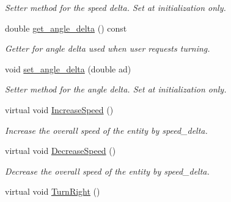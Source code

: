 \begin{DoxyCompactItemize}
\begin{DoxyCompactList}\small\item\em Setter method for the speed delta. Set at initialization only. \end{DoxyCompactList}\item 
double \hyperlink{classMotionHandler_a67c945d11edc741af5c71c3596ead557}{get\+\_\+angle\+\_\+delta} () const \hypertarget{classMotionHandler_a67c945d11edc741af5c71c3596ead557}{}\label{classMotionHandler_a67c945d11edc741af5c71c3596ead557}

\begin{DoxyCompactList}\small\item\em Getter for angle delta used when user requests turning. \end{DoxyCompactList}\item 
void \hyperlink{classMotionHandler_a8c2811ddf1a0f077fec829c460009286}{set\+\_\+angle\+\_\+delta} (double ad)\hypertarget{classMotionHandler_a8c2811ddf1a0f077fec829c460009286}{}\label{classMotionHandler_a8c2811ddf1a0f077fec829c460009286}

\begin{DoxyCompactList}\small\item\em Setter method for the angle delta. Set at initialization only. \end{DoxyCompactList}\item 
virtual void \hyperlink{classMotionHandler_af6b91f5626075b09dba3d14177213622}{Increase\+Speed} ()\hypertarget{classMotionHandler_af6b91f5626075b09dba3d14177213622}{}\label{classMotionHandler_af6b91f5626075b09dba3d14177213622}

\begin{DoxyCompactList}\small\item\em Increase the overall speed of the entity by speed\+\_\+delta. \end{DoxyCompactList}\item 
virtual void \hyperlink{classMotionHandler_a25ad77fb1a4c79f8303a256b7e1cbc9c}{Decrease\+Speed} ()\hypertarget{classMotionHandler_a25ad77fb1a4c79f8303a256b7e1cbc9c}{}\label{classMotionHandler_a25ad77fb1a4c79f8303a256b7e1cbc9c}

\begin{DoxyCompactList}\small\item\em Decrease the overall speed of the entity by speed\+\_\+delta. \end{DoxyCompactList}\item 
virtual void \hyperlink{classMotionHandler_a22b99a21307a534165d811740d8aeac1}{Turn\+Right} ()\hypertarget{classMotionHandler_a22b99a21307a534165d811740d8aeac1}{}\label{classMotionHandler_a22b99a21307a534165d811740d8aeac1}


\end{DoxyCompactItemize}
